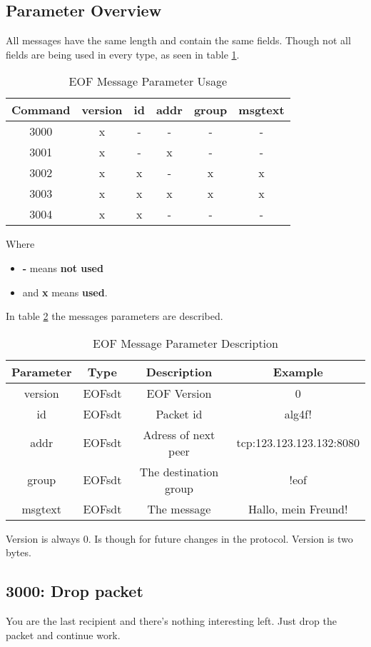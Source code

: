 \subsection{Parameter Overview}
All messages have the same length and contain the same fields.
Though not all fields are being used in every type, as seen in table
\ref{eofmessageparameteroverview}.
\begin{longtable}{|c|c|c|c|c|c|}
\caption{EOF Message Parameter Usage}
\label{eofmessageparameteroverview}
\\
\hline
\textbf{Command} & \textbf{version} & \textbf{id} & \textbf{addr} & \textbf{group} & \textbf{msgtext}\\
\hline
3000 &x & - & - & - & - \\
\hline
3001 &x & - & x & - & - \\
\hline
3002 &x & x & - & x & x \\
\hline
3003 &x & x & x & x & x \\
\hline
3004 &x & x & - & - & -\\
\hline
\end{longtable}
Where 
\begin{itemize}
\item \textbf{-} means \textbf{not used}
\item and \textbf{x} means \textbf{used}.
\end{itemize}
In table \ref{eofmessagedescription} the messages
parameters are described.
\begin{longtable}{|c|c|c|c|}
\caption{EOF Message Parameter Description}
\label{eofmessagedescription}
\\
\hline
\textbf{Parameter} & \textbf{Type} & \textbf{Description} & \textbf{Example}\\
\hline
version & EOFsdt & EOF Version & 0\\
\hline
id & EOFsdt & Packet id & alg4f!\\
\hline
addr & EOFsdt & Adress of next peer & tcp:123.123.123.132:8080\\
\hline
group & EOFsdt & The destination group & !eof\\
\hline
msgtext & EOFsdt & The message & Hallo, mein Freund!\\
\hline
\end{longtable}
Version is always 0. Is though for future changes in the protocol.
Version is two bytes.
\subsection{3000: Drop packet}
You are the last recipient and there's nothing interesting left.
Just drop the packet and continue work.
